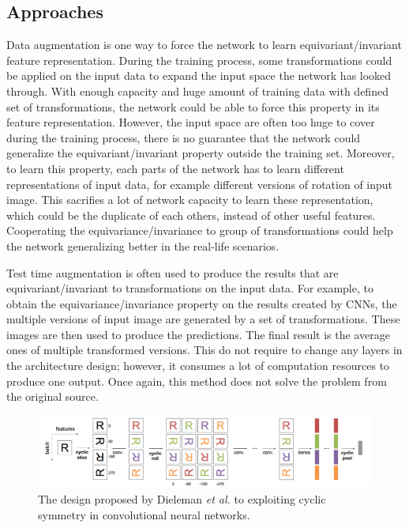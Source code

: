 \subsection{Approaches}
Data augmentation is one way to force the network to learn equivariant/invariant feature representation. During the training process, some transformations could be applied on the input data to expand the input space the network has looked through. With enough capacity and huge amount of training data with defined set of transformations, the network could be able to force this property in its feature representation. However, the input space are often too huge to cover during the training process, there is no guarantee that the network could generalize the equivariant/invariant property outside the training set. Moreover, to learn this property, each parts of the network has to learn different representations of input data, for example different versions of rotation of input image. This sacrifies a lot of network capacity to learn these representation, which could be the duplicate of each others, instead of other useful features. Cooperating the equivariance/invariance to group of transformations could help the network generalizing better in the real-life scenarios.

Test time augmentation is often used to produce the results that are equivariant/invariant to transformations on the input data. For example, to obtain the equivariance/invariance property on the results created by CNNs, the multiple versions of input image are generated by a set of transformations. These images are then used to produce the predictions. The final result is the average ones of multiple transformed versions. This do not require to change any layers in the architecture design; however, it consumes a lot of computation resources to produce one output. Once again, this method does not solve the problem from the original source.  

\begin{figure}[thb]
    \centering
    \includegraphics[width=\textwidth]{resources/2_exploting_symmetry.png}
    \caption{The design proposed by Dieleman \textit{et al.} \cite{cyclic_symmetry} to exploiting cyclic symmetry in convolutional neural networks. }
    \label{fig:cyclic_symmetry}
\end{figure}

